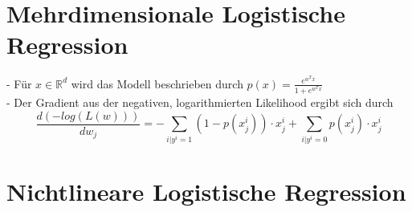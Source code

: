 \documentclass{report}
\begin{document}
\section{Mehrdimensionale Logistische Regression}
- Für $x \in \mathbb{R}^d$ wird das Modell beschrieben durch $p(x) = \frac{e^{w^Tx}}{1 + e^{w^Tx}}$\\
- Der Gradient aus der negativen, logarithmierten Likelihood ergibt sich durch
$$\frac{d(-log(L(w)))}{dw_j} = -\sum_{i|y^i = 1}(1 - p(x_j^i))\cdot x_j^i + \sum_{i|y^i = 0}p(x_j^i)\cdot x_j^i$$

\section{Nichtlineare Logistische Regression}
\end{document}
